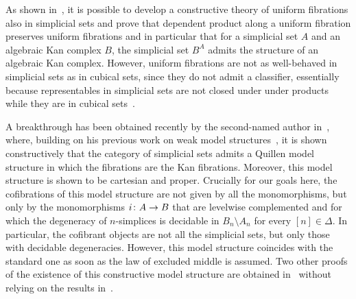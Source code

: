 \documentclass[reqno,10pt,a4paper,oneside,draft]{amsart}
\begin{document}
As shown in~\cite{gambino2017frobenius}, it is possible to develop  a constructive theory of uniform fibrations
also in simplicial sets and prove that dependent product along a uniform fibration preserves
uniform fibrations and in particular that for a simplicial set $A$ and an 
 algebraic Kan complex $B$, the simplicial set $B^A$ admits the structure of an algebraic Kan complex. However,  uniform fibrations
are not as well-behaved in simplicial sets as in cubical sets,
since they do not admit a classifier, essentially because 
representables  in simplicial sets are not closed under under products while they are in cubical sets~\cite{SattlerC:faiaut}. 





A breakthrough has been obtained recently by the second-named author in~\cite{henry2019qms}, where, building on his previous work on weak model structures~\cite{henry2018wms},
it is shown constructively that the category of simplicial sets admits a Quillen model structure in which the
fibrations are the Kan fibrations. Moreover, this model structure is shown to be cartesian and proper.  Crucially for our goals here, 
the cofibrations of this model structure are not given by all the monomorphisms, but only by the monomorphisms $i \colon A \to B$ that are levelwise complemented 
and for which the degeneracy of $n$-simplices is decidable in $B_n \setminus A_n$ for every $[n] \in \Delta$. In particular, the cofibrant objects are not all the simplicial sets, but only those with decidable degeneracies. However, this model structure coincides with
the standard one as soon as the law of excluded middle is assumed. Two other  
proofs of the  existence of this constructive
model structure are obtained in~\cite{GambinoN:anocp} without relying on the results in~\cite{henry2018wms}. 

\medskip
\end{document}
